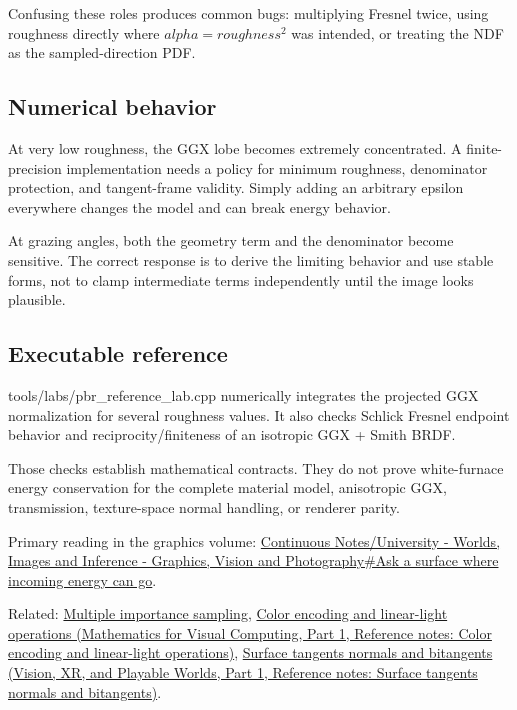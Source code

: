 Confusing these roles produces common bugs: multiplying Fresnel twice, using roughness directly where \(alpha=roughness^2\) was intended, or treating the NDF as the sampled-direction PDF.

\subsection{Numerical behavior}\label{appendix-885c1cb64ae9-numerical-behavior}

\hypertarget{appendix-885c1cb64ae9-numerical-behavior}{}

At very low roughness, the GGX lobe becomes extremely concentrated. A finite-precision implementation needs a policy for minimum roughness, denominator protection, and tangent-frame validity. Simply adding an arbitrary epsilon everywhere changes the model and can break energy behavior.

At grazing angles, both the geometry term and the denominator become sensitive. The correct response is to derive the limiting behavior and use stable forms, not to clamp intermediate terms independently until the image looks plausible.

\subsection{Executable reference}\label{appendix-885c1cb64ae9-executable-reference}

\hypertarget{appendix-885c1cb64ae9-executable-reference}{}

tools/labs/pbr\_reference\_lab.cpp numerically integrates the projected GGX normalization for several roughness values. It also checks Schlick Fresnel endpoint behavior and reciprocity/finiteness of an isotropic GGX + Smith BRDF.

Those checks establish mathematical contracts. They do not prove white-furnace energy conservation for the complete material model, anisotropic GGX, transmission, texture-space normal handling, or renderer parity.

Primary reading in the graphics volume: \hyperref[03-visual-computing-i-ch005-ask-a-surface-where-incoming-energy-can-go]{Continuous Notes/University - Worlds, Images and Inference - Graphics, Vision and Photography\#Ask a surface where incoming energy can go}.

Related: \hyperref[appendix-ca8898faf1a6]{Multiple importance sampling}, \href{../02-Mathematics-for-Visual-Computing-P01/main.pdf\#nameddest=appendix-a9f83ad40792}{Color encoding and linear-light operations (Mathematics for Visual Computing, Part 1, Reference notes: Color encoding and linear-light operations)}, \href{../07-Vision-XR-and-Playable-Worlds-P01/main.pdf\#nameddest=appendix-e31893dec985}{Surface tangents normals and bitangents (Vision, XR, and Playable Worlds, Part 1, Reference notes: Surface tangents normals and bitangents)}.

